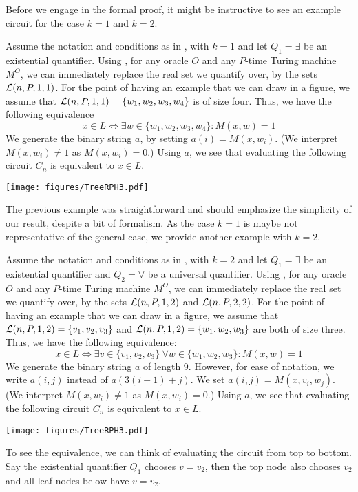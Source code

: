 \documentclass{article}
\begin{document}
Before we engage in the formal proof, it might be instructive to see an example circuit for the case $k=1$ and $k=2$.

\begin{example}
\label{eg:kis1}
    Assume the notation and conditions as in , with $k=1$ and let $Q_1 = \exists$ be an existential quantifier.
    Using , for any oracle $O$ and any $P$-time Turing machine $M^O$, we can immediately replace the real set we quantify over, by the sets 
    $\mathcal{L}(n,P,1,1)$.
    For the point of having an example that we can draw in a figure, 
    we assume that $\mathcal{L}(n,P,1,1) = \{w_1,w_2,w_3,w_4\}$ is of size four.
    Thus, we have the following equivalence
    \[x\in L \Leftrightarrow \exists w\in \{w_1,w_2,w_3,w_4\} : M(x,w) = 1\]
    We generate the binary string $a$, by setting 
    $a(i) = M(x,w_i)$.
    (We interpret $M(x,w_i) \neq 1$ as $M(x,w_i) = 0$.)
    Using $a$, we see that evaluating the following circuit $C_n$ is equivalent to $x\in L$.
    \begin{center}
        \texttt{[image: figures/TreeRPH3.pdf]}    
    \end{center}
\end{example}
The previous example was straightforward and should emphasize the simplicity of our result, despite a bit of formalism.
As the case $k=1$ is maybe not representative of the general case, we provide another example with $k=2$.

\begin{example}
    \label{ex:depth2tree}
    Assume the notation and conditions as in , with $k=2$ and let $Q_1 = \exists$ be an existential quantifier and $Q_2 = \forall$ be a universal quantifier.
    Using , for any oracle $O$ and any $P$-time Turing machine $M^O$, we can immediately replace the real set we quantify over, by the sets 
    $\mathcal{L}(n,P,1,2)$ and $\mathcal{L}(n,P,2,2)$.
    For the point of having an example that we can draw in a figure, 
    we assume that 
    $\mathcal{L}(n,P,1,2) = \{v_1,v_2,v_3\}$
    and
    $\mathcal{L}(n,P,1,2) = \{w_1,w_2,w_3\}$
    are both of size three.
    Thus, we have the following equivalence:
    \[x\in L \Leftrightarrow \exists v\in \{v_1,v_2,v_3\} \ \forall w \in \{w_1,w_2,w_3\}  : M(x,w) = 1\]
    We generate the binary string $a$ of length $9$.
    However, for ease of notation, we write 
    $a(i,j)$ instead of $a(3(i-1)+j)$.
    We set $a(i,j) = M(x,v_i,w_j)$.
    (We interpret $M(x,w_i) \neq 1$ as $M(x,w_i) = 0$.)
    Using $a$, we see that evaluating the following circuit $C_n$ is equivalent to $x\in L$.
    \begin{center}
        \texttt{[image: figures/TreeRPH3.pdf]}    
    \end{center}
    To see the equivalence, we can think of evaluating the circuit from top to bottom.
    Say the existential quantifier $Q_1$ chooses $v = v_2$,
    then the top node also  chooses $v_2$ and all leaf nodes below have $v = v_2$.
\end{example}
\end{document}

